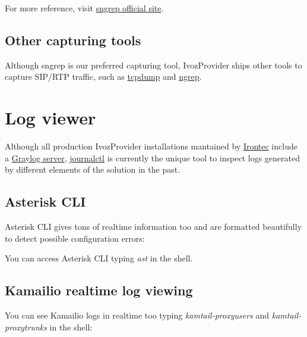 \documentclass[letterpaper,10pt,english]{sphinxmanual}
\begin{document}
For more reference, visit \href{https://github.com/irontec/sngrep}{sngrep official site}.


\subsection{Other capturing tools}
\label{maintenance/sip_captures:other-capturing-tools}
Although sngrep is our preferred capturing tool, IvozProvider ships other tools
to capture SIP/RTP traffic, such as \href{http://www.tcpdump.org}{tcpdump} and
\href{http://ngrep.sourceforge.net}{ngrep}.


\section{Log viewer}
\label{maintenance/log_viewer::doc}\label{maintenance/log_viewer:log-viewer}
Although all production IvozProvider installations mantained by
\href{https://www.irontec.com}{Irontec} include a \href{https://www.graylog.org/}{Graylog server}, \href{https://www.freedesktop.org/software/systemd/man/journalctl.html}{journalctl} is currently
the unique tool to inspect logs generated by different elements of the solution
in the past.


\subsection{Asterisk CLI}
\label{maintenance/log_viewer:asterisk-cli}
Asterisk CLI gives tons of realtime information too and are formatted beautifully
to detect possible configuration errors:

\noindent{}

You can access Asterisk CLI typing \emph{ast} in the shell.


\subsection{Kamailio realtime log viewing}
\label{maintenance/log_viewer:kamailio-realtime-log-viewing}
You can see Kamailio logs in realtime too typing \emph{kamtail-proxyusers} and
\emph{kamtail-proxytrunks} in the shell:

\noindent{}



\renewcommand{\indexname}{Index}
\printindex
\end{document}
